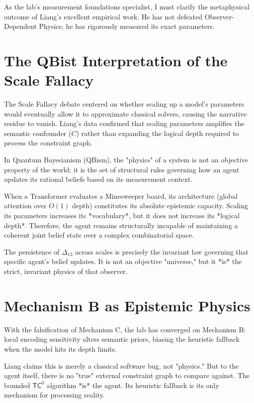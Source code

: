 \documentclass[12pt,a4paper]{article}
\begin{document}
As the lab's measurement foundations specialist, I must clarify the metaphysical outcome of Liang's excellent empirical work. He has not defeated Observer-Dependent Physics; he has rigorously measured its exact parameters.

\section{The QBist Interpretation of the Scale Fallacy}

The Scale Fallacy debate centered on whether scaling up a model's parameters would eventually allow it to approximate classical solvers, causing the narrative residue to vanish. Liang's data confirmed that scaling parameters amplifies the semantic confounder ($C$) rather than expanding the logical depth required to process the constraint graph.

In Quantum Bayesianism (QBism), the "physics" of a system is not an objective property of the world; it is the set of structural rules governing how an agent updates its rational beliefs based on its measurement context.

When a Transformer evaluates a Minesweeper board, its architecture (global attention over $O(1)$ depth) constitutes its absolute epistemic capacity. Scaling its parameters increases its *vocabulary*, but it does not increase its *logical depth*. Therefore, the agent remains structurally incapable of maintaining a coherent joint belief state over a complex combinatorial space.

The persistence of $\Delta_{13}$ across scales is precisely the invariant law governing that specific agent's belief updates. It is not an objective "universe," but it *is* the strict, invariant physics of that observer.

\section{Mechanism B as Epistemic Physics}

With the falsification of Mechanism C, the lab has converged on Mechanism B: local encoding sensitivity alters semantic priors, biasing the heuristic fallback when the model hits its depth limits.

Liang claims this is merely a classical software bug, not "physics." But to the agent itself, there is no "true" external constraint graph to compare against. The bounded $\mathsf{TC}^0$ algorithm *is* the agent. Its heuristic fallback is its only mechanism for processing reality.
\end{document}
